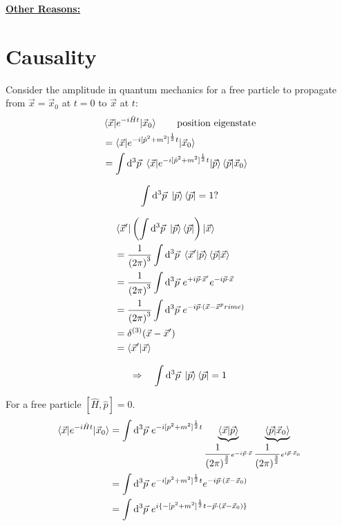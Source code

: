 \documentclass{article}
\begin{document}
\vspace{12pt}
\noindent \underline{\textbf{Other Reasons:}}

\section{Causality}

Consider the amplitude in quantum mechanics for a free particle to propagate from $ \vec{x} = \vec{x}_0 $ at $ t = 0 $ to $ \vec{x} $ at $t$:
\begin{align*}
& \braket{ \vec{x} | e^{ -i \hat{H} t } | \vec{x}_0 } \qquad \mathrm{position~eigenstate} \\
&= \braket{ \vec{x} | e^{ -i {[ \hat{p}^2 + m^2 ]}^\frac{1}{2} t } | \vec{x}_0 } \\
&= \int \mathrm{d}^3 \vec{p} ~ \braket{ \vec{x} | e^{ -i {[ \hat{p}^2 + m^2 ]}^\frac{1}{2} t } | \vec{p} } \braket{ \vec{p} | \vec{x}_0 }
\end{align*}


\begin{equation*}
\int \mathrm{d}^3 \vec{p} ~ \ket{\vec{p}} \bra{\vec{p}} = 1 ?
\end{equation*}

\begin{align*}
& \braket{ \vec{x}^\prime | \left( \int \mathrm{d}^3 \vec{p} ~ \ket{\vec{p}} \bra{\vec{p}} \right) | \vec{x} } \\
&= \frac{1}{{(2 \pi)}^3} \int \mathrm{d}^3 \vec{p} ~ \braket{ \vec{x}^\prime | \vec{p} } \braket{ \vec{p} | \vec{x} } \\
&= \frac{1}{{(2 \pi)}^3} \int \mathrm{d}^3 \vec{p} ~ e^{ +i \vec{p} \cdot \vec{x}^\prime } e^{ -i \vec{p} \cdot \vec{x} } \\
&= \frac{1}{{(2 \pi)}^3} \int \mathrm{d}^3 \vec{p} ~ e^{ -i \vec{p} \cdot ( \vec{x} - \vec{x}^prime ) } \\
&= \delta^{(3)} ( \vec{x} - \vec{x}^\prime ) \\
&= \braket{ \vec{x}^\prime | \vec{x} }
\end{align*}

\begin{equation*}
\Rightarrow \quad \int \mathrm{d}^3 \vec{p} ~ \ket{\vec{p}} \bra{\vec{p}} = 1
\end{equation*}


\noindent For a free particle $[ \hat{H}, \hat{p} ] = 0 $.
\begin{align*}
\braket{ \vec{x} | e^{ -i \hat{H} t } | \vec{x}_0 } &= \int \mathrm{d}^3 \vec{p} ~ e^{ -i {[ p^2 + m^2 ]}^\frac{1}{2} t } \underbrace{\braket{ \vec{x} | \vec{p} }}_{ \dfrac{1}{{(2 \pi)}^\frac{3}{2}} e^{ -i \vec{p} \cdot \vec{x} } } \underbrace{\braket{ \vec{p} | \vec{x}_0 }}_{ \dfrac{1}{{(2 \pi)}^\frac{3}{2}} e^{ i \vec{p} \cdot \vec{x}_0 } } \\
&= \int \mathrm{d}^3 \vec{p} ~ e^{ -i {[ p^2 + m^2 ]}^\frac{1}{2} t } e^{ -i \vec{p} \cdot ( \vec{x} - \vec{x}_0 ) } \\
&= \int \mathrm{d}^3 \vec{p} ~ e^{ i \lbrace -{[ p^2 + m^2 ]}^\frac{1}{2} t - \vec{p} \cdot ( \vec{x} - \vec{x}_0 ) \rbrace }
\end{align*}
\end{document}
